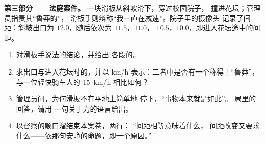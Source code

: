 \begin{problem}
\medskip\noindent\textbf{第三部分——法庭案件。}
一块滑板从斜坡滑下，穿过校园院子，
撞进花坛；管理员指责其“鲁莽的”，
滑板手则辩称“我一直在减速”。院子里的摄像头
记录了间距：斜坡出口为 $12.0$，随后依次为 $11.5$，$11.0$，
$10.5$，$10.0$，即进入花坛途中的间距。
\begin{enumerate}[resume]
  \item 对滑板手说法的结论，并给出
        各段的。
  \item 求出口与进入花坛时的，并以
        \unit{km/h} 表示：二者中是否有一个称得上“鲁莽”，
        与一位轻快骑车人的 \qty{15}{km/h} 相比如何？
  \item 管理员问，为何滑板不在平地上简单地
        停下，“事物本来就是如此”。
        局里的回答，请用
        一句关于力的语言给出。
  \item 以督察的顺口溜结束本案卷，两行：
        “间距相等意味着什么，
        间距改变又要求什么——依那句安静的命题，即一个原因。”
\end{enumerate}
\end{problem}
